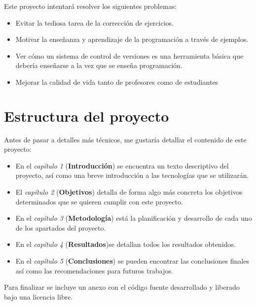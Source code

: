 Este proyecto intentará resolver los siguientes problemas:

\begin{itemize}
  \item Evitar la tediosa tarea de la corrección de ejercicios.
  \item Motivar la enseñanza y aprendizaje de la programación a través de ejemplos.
  \item Ver cómo un sistema de control de versiones es una herramienta básica que debería enseñarse a la vez que se enseña programación.
  \item Mejorar la calidad de vida tanto de profesores como de estudiantes
\end{itemize}

\section{Estructura del proyecto}


\bigskip
Antes de pasar a detalles más técnicos, me gustaría detallar el contenido de este proyecto:

\begin{itemize}
  \item En el \textit{capítulo 1} (\textbf{Introducción}) se encuentra un texto descriptivo del proyecto, así como una breve introducción a las tecnologías que se utilizarán.\cite{QueueSystems}
  \item El \textit{capítulo 2} (\textbf{Objetivos}) detalla de forma algo más concreta los objetivos determinados que se quieren cumplir con este proyecto.
  \item En el \textit{capítulo 3} (\textbf{Metodología}) está la planificación y desarrollo de cada uno de los apartados del proyecto.
  \item En el \textit{capítulo 4} (\textbf{Resultados})se detallan todos los resultados obtenidos.
  \item En el \textit{capítulo 5} (\textbf{Conclusiones}) se pueden encontrar las conclusiones finales  así como las recomendaciones para futuros trabajos.

\end{itemize}


\bigskip
Para finalizar se incluye un anexo con el código fuente desarrollado y liberado bajo una licencia libre.





